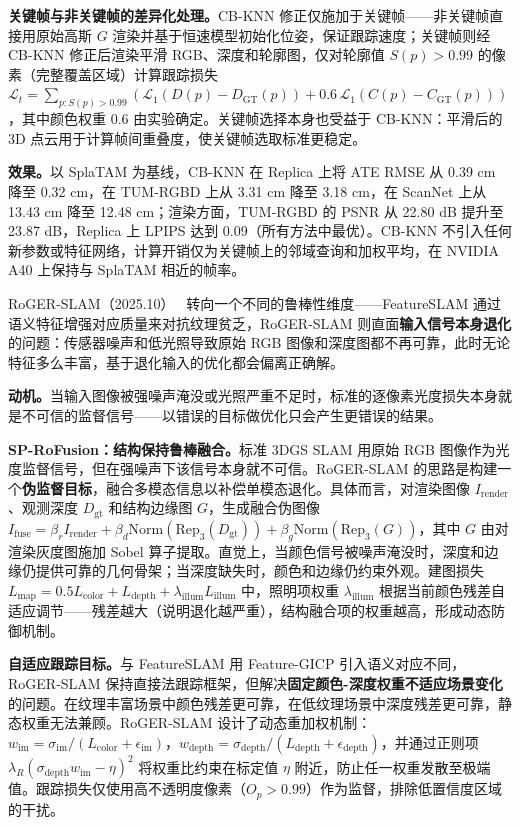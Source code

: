 \textbf{关键帧与非关键帧的差异化处理。}CB-KNN 修正仅施加于关键帧——非关键帧直接用原始高斯 $G$ 渲染并基于恒速模型初始化位姿，保证跟踪速度；关键帧则经 CB-KNN 修正后渲染平滑 RGB、深度和轮廓图，仅对轮廓值 $S(p) > 0.99$ 的像素（完整覆盖区域）计算跟踪损失 $\mathcal{L}_t = \sum_{p: S(p)>0.99} (\mathcal{L}_1(D(p) - D_\text{GT}(p)) + 0.6\,\mathcal{L}_1(C(p) - C_\text{GT}(p)))$，其中颜色权重 $0.6$ 由实验确定。关键帧选择本身也受益于 CB-KNN：平滑后的 3D 点云用于计算帧间重叠度，使关键帧选取标准更稳定。

\textbf{效果。}以 SplaTAM 为基线，CB-KNN 在 Replica 上将 ATE RMSE 从 0.39 cm 降至 0.32 cm，在 TUM-RGBD 上从 3.31 cm 降至 3.18 cm，在 ScanNet 上从 13.43 cm 降至 12.48 cm；渲染方面，TUM-RGBD 的 PSNR 从 22.80 dB 提升至 23.87 dB，Replica 上 LPIPS 达到 0.09（所有方法中最优）。CB-KNN 不引入任何新参数或特征网络，计算开销仅为关键帧上的邻域查询和加权平均，在 NVIDIA A40 上保持与 SplaTAM 相近的帧率。

RoGER-SLAM（2025.10）~\cite{2510_22600} 转向一个不同的鲁棒性维度——FeatureSLAM 通过语义特征增强对应质量来对抗纹理贫乏，RoGER-SLAM 则直面\textbf{输入信号本身退化}的问题：传感器噪声和低光照导致原始 RGB 图像和深度图都不再可靠，此时无论特征多么丰富，基于退化输入的优化都会偏离正确解。

\textbf{动机。}当输入图像被强噪声淹没或光照严重不足时，标准的逐像素光度损失本身就是不可信的监督信号——以错误的目标做优化只会产生更错误的结果。

\textbf{SP-RoFusion：结构保持鲁棒融合。}标准 3DGS SLAM 用原始 RGB 图像作为光度监督信号，但在强噪声下该信号本身就不可信。RoGER-SLAM 的思路是构建一个\textbf{伪监督目标}，融合多模态信息以补偿单模态退化。具体而言，对渲染图像 $I_\text{render}$、观测深度 $D_\text{gt}$ 和结构边缘图 $G$，生成融合伪图像 $I_\text{fuse} = \beta_r I_\text{render} + \beta_d \text{Norm}(\text{Rep}_3(D_\text{gt})) + \beta_g \text{Norm}(\text{Rep}_3(G))$，其中 $G$ 由对渲染灰度图施加 Sobel 算子提取。直觉上，当颜色信号被噪声淹没时，深度和边缘仍提供可靠的几何骨架；当深度缺失时，颜色和边缘仍约束外观。建图损失 $L_\text{map} = 0.5 L_\text{color} + L_\text{depth} + \lambda_\text{illum} L_\text{illum}$ 中，照明项权重 $\lambda_\text{illum}$ 根据当前颜色残差自适应调节——残差越大（说明退化越严重），结构融合项的权重越高，形成动态防御机制。

\textbf{自适应跟踪目标。}与 FeatureSLAM 用 Feature-GICP 引入语义对应不同，RoGER-SLAM 保持直接法跟踪框架，但解决\textbf{固定颜色-深度权重不适应场景变化}的问题。在纹理丰富场景中颜色残差更可靠，在低纹理场景中深度残差更可靠，静态权重无法兼顾。RoGER-SLAM 设计了动态重加权机制：$w_\text{im} = \sigma_\text{im}/(L_\text{color} + \epsilon_\text{im})$，$w_\text{depth} = \sigma_\text{depth}/(L_\text{depth} + \epsilon_\text{depth})$，并通过正则项 $\lambda_R(\sigma_\text{depth} w_\text{im} - \eta)^2$ 将权重比约束在标定值 $\eta$ 附近，防止任一权重发散至极端值。跟踪损失仅使用高不透明度像素（$O_p > 0.99$）作为监督，排除低置信度区域的干扰。

